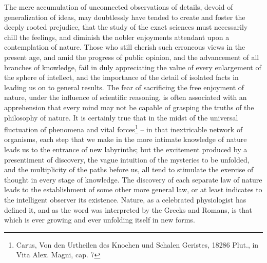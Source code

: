 The mere accumulation of unconnected observations of details, devoid of generalization of ideas, may doubtlessly have tended to create and foster the deeply rooted prejudice, that the study of the exact sciences must necessarily chill the feelings, and diminish the nobler enjoyments attendant upon a contemplation of nature. Those who still cherish such erroneous views in the present age, and amid the progress of public opinion, and the advancement of all branches of knowledge, fail in duly appreciating the value of every enlargement of the sphere of intellect, and the importance of the detail of isolated facts in leading us on to general results. The fear of sacrificing the free enjoyment of nature, under the influence of scientific reasoning, is often associated with an apprehension that every mind may not be capable of grasping the truths of the philosophy of nature. It is certainly true that in the midst of the universal fluctuation of phenomena and vital forces\footnote{Carus, Von den Urtheilen des Knochen und Schalen Geristes, 18286  Plut., in Vita Alex. Magni, cap. 7} -- in that inextricable network of organisms, each step that we make in the more intimate knowledge of nature leads us to the entrance of new labyrinths; but the excitement produced by a presentiment of discovery, the vague intuition of the mysteries to be unfolded, and the multiplicity of the paths before us, all tend to stimulate the exercise of thought in every stage of knowledge. The discovery of each separate law of nature leads to the establishment of some other more general law, or at least indicates to the intelligent observer its existence. Nature, as a celebrated physiologist has defined it, and as the word was interpreted by the Greeks and Romans, is that which is ever growing and ever unfolding itself in new forms.


